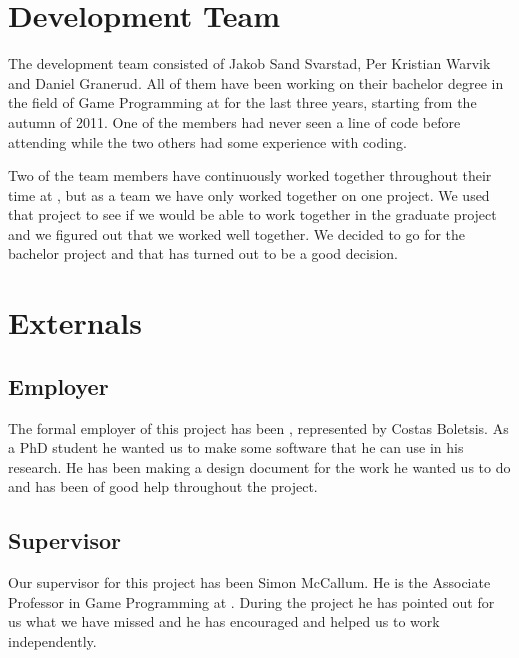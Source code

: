 \section{Development Team}
The development team consisted of Jakob Sand Svarstad, Per Kristian Warvik and Daniel Granerud.
All of them have been working on their bachelor degree in the field of Game Programming at \GUC{} for the last three years, starting from the autumn of 2011. One of the members had never seen a line of code before attending \GUC{} while the two others had some experience with coding.

Two of the team members have continuously worked together throughout their time at \GUC{}, but as a team we have only worked together on one project. We used that project to see if we would be able to work together in the graduate project and we figured out that we worked well together. We decided to go for the bachelor project and that has turned out to be a good decision.

\section{Externals}

\subsection{Employer}
The formal employer of this project has been \GUC{}, represented by Costas Boletsis. As a PhD student he wanted us to make some software that he can use in his research. He has been making a design document for the work he wanted us to do and has been of good help throughout the project.

\subsection{Supervisor}
Our supervisor for this project has been Simon McCallum. He is the Associate Professor in Game Programming at \GUC{}. During the project he has pointed out for us what we have missed and he has encouraged and helped us to work independently.
